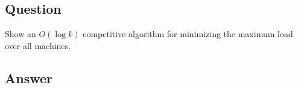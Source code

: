 \subsection{Question}
Show an $O(\log k)$ competitive algorithm for minimizing the maximum load over all machines.\\

\subsection{Answer}
